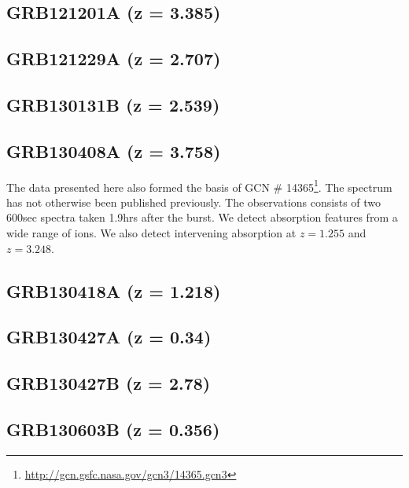 \documentclass{aa}    %
\begin{document}
\subsection{GRB121201A (z = 3.385)}		




\subsection{GRB121229A (z = 2.707)}		





\subsection{GRB130131B (z = 2.539)}		





\subsection{GRB130408A (z = 3.758)}
The data presented here also formed the basis of GCN \#
14365\footnote{\url{http://gcn.gsfc.nasa.gov/gcn3/14365.gcn3}}. The spectrum
has not otherwise been published previously. The observations consists of two
600sec spectra taken 1.9hrs after the burst. We detect absorption features from
a wide range of ions. We also detect intervening absorption at $z=1.255$ and
$z=3.248$.



\subsection{GRB130418A (z = 1.218)}	




\subsection{GRB130427A (z = 0.34)}	




\subsection{GRB130427B (z = 2.78)}	




\subsection{GRB130603B (z = 0.356)}	
\end{document}
